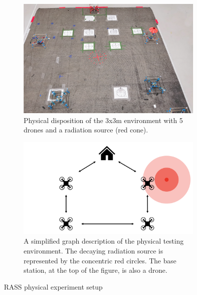 \begin{figure}[htbp]
    \centering
    \begin{subfigure}{0.9\textwidth}
        \includegraphics[width=\textwidth]{figures/dora_mesh/cognifly.jpg}
        \caption[RASS physical experiment setup]{Physical disposition of the 3x3m environment with 5 drones and a radiation source (red cone).}
        \label{cogniflyExperiment}
    \end{subfigure}
    \begin{subfigure}{0.9\textwidth}
        \includegraphics[width=\textwidth]{figures/dora_mesh/lab_graph_left.png}
        \caption[RASS physical experiment schema]{A simplified graph description of the physical testing environment. The decaying radiation source is represented by the concentric red circles. The base station, at the top of the figure, is also a drone.}
        \label{cogniflyGraph}
    \end{subfigure}
    \caption{RASS physical experiment setup}
    \label{cogniflyPhysical}
\end{figure}

